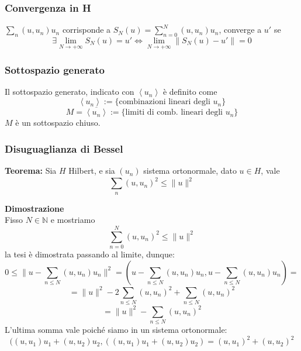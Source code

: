 \documentclass[a4paper]{article}
\newcommand{\N}{\mathbb{N}}
\begin{document}
\subsubsection{Convergenza in H}
$\sum_{n}^{} (u,u_n)u_n $ corrisponde a $S_N(u)=\sum_{n=0}^{N} (u,u_n)u_n$, converge a $u'$ se 
\[\exists \lim_{N \to +\infty} S_N(u)=u' \iff \lim_{N \to +\infty} \|S_N(u)-u'\|=0\]
\subsubsection{Sottospazio generato}
Il sottospazio generato, indicato con $\left< u_n \right> $ è definito come
\[\left< u_n \right> :=\{\text{combinazioni lineari degli }u_n\} \]
\[M=\overline{\left< u_n \right> }:=\{\text{limiti di comb. lineari degli }u_n\} \]
$M$ è un sottospazio chiuso.
\subsubsection{Disuguaglianza di Bessel}
\begin{tcolorbox}
	\textbf{Teorema: }Sia $H$ Hilbert, e sia $(u_n)$ sistema ortonormale, dato $u\in H$, vale 
	\[\sum_{n}^{} (u,u_n)^2\le \|u\|^2\]
\end{tcolorbox}
\textbf{Dimostrazione} 
\\Fisso $N\in \N$ e mostriamo
\[\sum_{n=0}^{N} (u,u_n)^2\le \|u\|^2\]
la tesi è dimostrata passando al limite, dunque:
\[0\le \|u-\sum_{n\le N}^{} (u,u_n)u_n\|^2=(u-\sum_{n\le N}^{} (u,u_n)u_n,u-\sum_{n\le N}^{} (u,u_n)u_n)=\]
\[=\|u\|^2 -2 \sum_{n\le N}^{} (u,u_n)^2+\sum_{n\le N}^{} (u,u_n)^2\]
\[=\|u\|^2-\sum_{n\le N}^{} (u,u_n)^2\]
L'ultima somma vale poiché siamo in un sistema ortonormale:
\[((u,u_1)u_1+(u,u_2)u_2,((u,u_1)u_1+(u,u_2)u_2)=(u,u_1)^2+(u,u_2)^2\]
\end{document}
